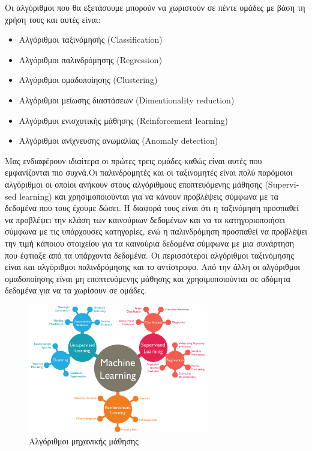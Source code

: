 Οι αλγόριθμοι που θα εξετάσουμε μπορούν να χωριστούν σε πέντε
ομάδες με βάση τη χρήση τους και αυτές είναι:
\begin{itemize}
    \item Αλγόριθμοι ταξινόμησής (\textlatin{Classification})
    \item Αλγόριθμοι παλινδρόμησης (\textlatin{Regression})
    \item Αλγόριθμοι ομαδοποίησης (\textlatin{Clustering})
    \item Αλγόριθμοι μείωσης διαστάσεων (\textlatin{Dimentionality reduction})
    \item Αλγόριθμοι ενισχυτικής μάθησης (\textlatin{Reinforcement learning})
    \item Αλγόριθμοι ανίχνευσης ανωμαλίας (\textlatin{Anomaly detection})
\end{itemize}
Μας ενδιαφέρουν ιδιαίτερα οι πρώτες τρεις ομάδες
καθώς είναι αυτές που
εμφανίζονται πιο συχνά.Οι παλινδρομητές και οι ταξινομητές είναι πολύ παρόμοιοι αλγόριθμοι οι οποίοι ανήκουν στους αλγόριθμους εποπτευόμενης
μάθησης (\textlatin{Supervised learning}) και χρησιμοποιούνται
για να κάνουν προβλέψεις σύμφωνα με τα δεδομένα
που τους έχουμε
δώσει. Η διαφορά τους είναι ότι η ταξινόμηση προσπαθεί να
προβλέψει την κλάση των καινούριων δεδομένων και να τα
κατηγοριοποιήσει σύμφωνα με τις υπάρχουσες κατηγορίες, ενώ η
παλινδρόμηση προσπαθεί να προβλέψει την τιμή κάποιου στοιχείου
για τα καινούρια δεδομένα σύμφωνα με μια συνάρτηση που
έφτιαξε
από τα υπάρχοντα δεδομένα. Οι περισσότεροι αλγόριθμοι ταξινόμησης είναι και
αλγόριθμοι παλινδρόμησης και το αντίστροφο. Από την άλλη οι αλγόριθμοι
ομαδοποίησης είναι μη εποπτευόμενης μάθησης και χρησιμοποιούνται σε αδόμητα
δεδομένα για να τα χωρίσουν σε ομάδες.
\begin{figure}[H]
    \centering
    \includegraphics[width=0.7\textwidth]{images/machineLearning.png}
    \caption{Αλγόριθμοι μηχανικής μάθησης}
\end{figure}
